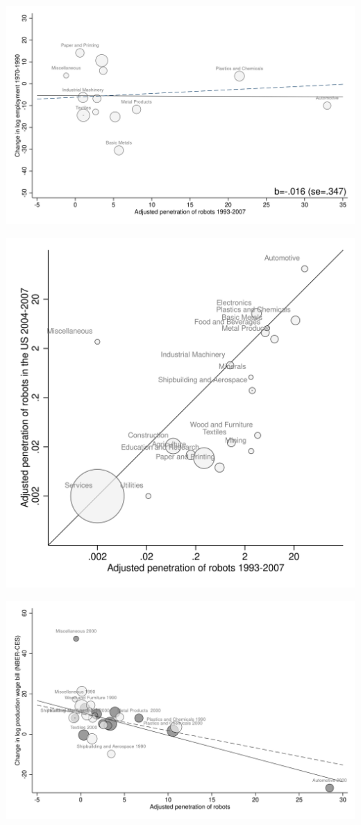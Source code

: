 \documentclass{article}
\begin{document}
\begin{center}\includegraphics[scale=0.15]{output/figure_industry_emp_placebo.png}\end{center}
\begin{center}\includegraphics[scale=0.15]{output/figure_industry_first_stage.png}\end{center}
\begin{center}\includegraphics[scale=0.15]{output/figure_industry_payblue_nber.png}\end{center}
\end{document}

